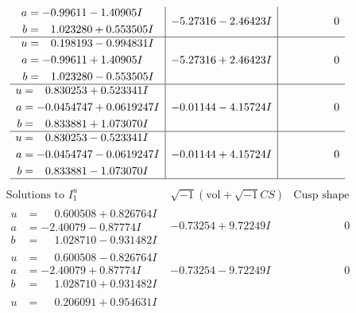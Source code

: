 \documentclass[1p]{elsarticle_modified}
\theoremstyle{definition}
\newcommand{\I}{\sqrt{-1}}
\begin{document}
$$\begin{array}{c|c|c}
\begin{aligned}
a &= -0.99611 - 1.40905 I \\
b &= \phantom{-}1.023280 + 0.553505 I\end{aligned}
 & -5.27316 - 2.46423 I & \phantom{-0.000000 } 0 \\ \hline\begin{aligned}
u &= \phantom{-}0.198193 - 0.994831 I \\
a &= -0.99611 + 1.40905 I \\
b &= \phantom{-}1.023280 - 0.553505 I\end{aligned}
 & -5.27316 + 2.46423 I & \phantom{-0.000000 } 0 \\ \hline\begin{aligned}
u &= \phantom{-}0.830253 + 0.523341 I \\
a &= -0.0454747 + 0.0619247 I \\
b &= \phantom{-}0.833881 + 1.073070 I\end{aligned}
 & -0.01144 - 4.15724 I & \phantom{-0.000000 } 0 \\ \hline\begin{aligned}
u &= \phantom{-}0.830253 - 0.523341 I \\
a &= -0.0454747 - 0.0619247 I \\
b &= \phantom{-}0.833881 - 1.073070 I\end{aligned}
 & -0.01144 + 4.15724 I & \phantom{-0.000000 } 0\\
 \hline 
 \end{array}$$\newpage$$\begin{array}{c|c|c}  
\text{Solutions to }I^u_{1}& \I (\text{vol} + \sqrt{-1}CS) & \text{Cusp shape}\\
 \hline 
\begin{aligned}
u &= \phantom{-}0.600508 + 0.826764 I \\
a &= -2.40079 - 0.87774 I \\
b &= \phantom{-}1.028710 - 0.931482 I\end{aligned}
 & -0.73254 + 9.72249 I & \phantom{-0.000000 } 0 \\ \hline\begin{aligned}
u &= \phantom{-}0.600508 - 0.826764 I \\
a &= -2.40079 + 0.87774 I \\
b &= \phantom{-}1.028710 + 0.931482 I\end{aligned}
 & -0.73254 - 9.72249 I & \phantom{-0.000000 } 0 \\ \hline\begin{aligned}
u &= \phantom{-}0.206091 + 0.954631 I \\

\end{aligned}
\end{array}$$
\end{document}
